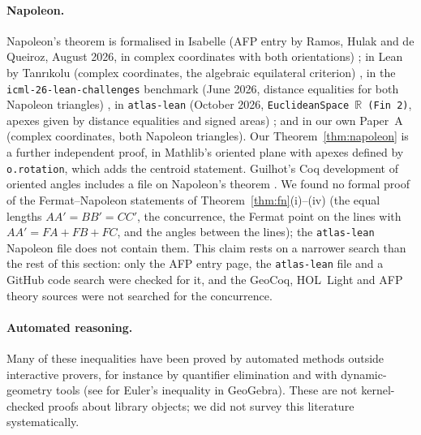 \documentclass[11pt]{article}
\theoremstyle{definition}
\theoremstyle{remark}
\newcommand{\lean}[1]{\texttt{#1}}
\begin{document}
\paragraph{Napoleon.} Napoleon's theorem is formalised in Isabelle (AFP entry by Ramos, Hulak and de
Queiroz, August 2026, in complex coordinates with both orientations) \cite{afpnapoleon}; in Lean by
Tanr\i{}kolu (complex coordinates, the algebraic equilateral criterion) \cite{tanrikolu}, in the
\lean{icml-26-lean-challenges} benchmark (June 2026, distance equalities for both Napoleon triangles)
\cite{shadowbench}, in \lean{atlas-lean} (October 2026, \lean{EuclideanSpace \(\mathbb{R}\) (Fin 2)},
apexes given by distance equalities and signed areas) \cite{atlasnapoleon}; and in our own Paper~A
\cite{paperA} (complex coordinates, both Napoleon triangles). Our Theorem~\ref{thm:napoleon} is a
further independent proof, in Mathlib's oriented plane with apexes defined by \lean{o.rotation},
which adds the centroid statement. Guilhot's Coq development of oriented angles includes a file on
Napoleon's theorem \cite{guilhot}. We found no formal proof of the Fermat--Napoleon statements of
Theorem~\ref{thm:fn}(i)--(iv) (the equal lengths $AA'=BB'=CC'$, the concurrence, the Fermat point on
the lines with $AA'=FA+FB+FC$, and the angles between the lines); the \lean{atlas-lean} Napoleon file
does not contain them. This claim rests on a narrower search than the rest of this section: only the
AFP entry page, the \lean{atlas-lean} file and a GitHub code search were checked for it, and the
GeoCoq, HOL~Light and AFP theory sources were not searched for the concurrence.

\paragraph{Automated reasoning.} Many of these inequalities have been proved by automated methods
outside interactive provers, for instance by quantifier elimination and with dynamic-geometry tools
(see \cite{kovacs2017} for Euler's inequality in GeoGebra). These are not kernel-checked proofs about
library objects; we did not survey this literature systematically.
\end{document}
